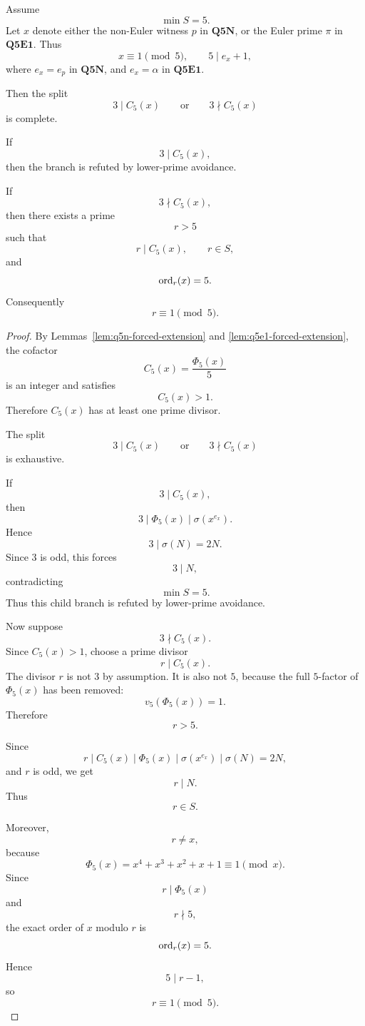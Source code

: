 \begin{proposition}
\label{prop:q5-phi5-second-level-split}
Assume
\[
  \min S=5.
\]
Let \(x\) denote either the non-Euler witness \(p\) in \(\mathbf{Q5N}\), or the
Euler prime \(\pi\) in \(\mathbf{Q5E1}\).  Thus
\[
  x\equiv1\pmod5,
  \qquad
  5\mid e_x+1,
\]
where \(e_x=e_p\) in \(\mathbf{Q5N}\), and \(e_x=\alpha\) in
\(\mathbf{Q5E1}\).

Then the split
\[
  3\mid C_5(x)
  \qquad\text{or}\qquad
  3\nmid C_5(x)
\]
is complete.

If
\[
  3\mid C_5(x),
\]
then the branch is refuted by lower-prime avoidance.

If
\[
  3\nmid C_5(x),
\]
then there exists a prime
\[
  r>5
\]
such that
\[
  r\mid C_5(x),
  \qquad
  r\in S,
\]
and
\[
  \operatorname{ord}_r(x)=5.
\]
Consequently
\[
  r\equiv1\pmod5.
\]
\end{proposition}

\begin{proof}
By Lemmas~\ref{lem:q5n-forced-extension} and
\ref{lem:q5e1-forced-extension}, the cofactor
\[
  C_5(x)=\frac{\Phi_5(x)}5
\]
is an integer and satisfies
\[
  C_5(x)>1.
\]
Therefore \(C_5(x)\) has at least one prime divisor.

The split
\[
  3\mid C_5(x)
  \qquad\text{or}\qquad
  3\nmid C_5(x)
\]
is exhaustive.

If
\[
  3\mid C_5(x),
\]
then
\[
  3\mid \Phi_5(x)\mid \sigma(x^{e_x}).
\]
Hence
\[
  3\mid \sigma(N)=2N.
\]
Since \(3\) is odd, this forces
\[
  3\mid N,
\]
contradicting
\[
  \min S=5.
\]
Thus this child branch is refuted by lower-prime avoidance.

Now suppose
\[
  3\nmid C_5(x).
\]
Since \(C_5(x)>1\), choose a prime divisor
\[
  r\mid C_5(x).
\]
The divisor \(r\) is not \(3\) by assumption.  It is also not \(5\), because the
full \(5\)-factor of \(\Phi_5(x)\) has been removed:
\[
  v_5(\Phi_5(x))=1.
\]
Therefore
\[
  r>5.
\]

Since
\[
  r\mid C_5(x)\mid \Phi_5(x)\mid \sigma(x^{e_x})\mid \sigma(N)=2N,
\]
and \(r\) is odd, we get
\[
  r\mid N.
\]
Thus
\[
  r\in S.
\]

Moreover,
\[
  r\ne x,
\]
because
\[
  \Phi_5(x)=x^4+x^3+x^2+x+1\equiv1\pmod x.
\]
Since
\[
  r\mid\Phi_5(x)
\]
and
\[
  r\nmid5,
\]
the exact order of \(x\) modulo \(r\) is
\[
  \operatorname{ord}_r(x)=5.
\]
Hence
\[
  5\mid r-1,
\]
so
\[
  r\equiv1\pmod5.
\]
\end{proof}


